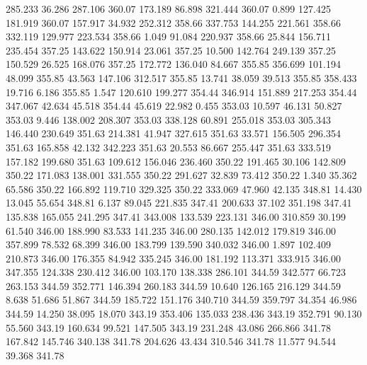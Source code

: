  285.233   36.286  287.106       360.07
 173.189   86.898  321.444       360.07
   0.899  127.425  181.919       360.07
 157.917   34.932  252.312       358.66
 337.753  144.255  221.561       358.66
 332.119  129.977  223.534       358.66
   1.049   91.084  220.937       358.66
  25.844  156.711  235.454       357.25
 143.622  150.914   23.061       357.25
  10.500  142.764  249.139       357.25
 150.529   26.525  168.076       357.25
 172.772  136.040   84.667       355.85
 356.699  101.194   48.099       355.85
  43.563  147.106  312.517       355.85
  13.741   38.059   39.513       355.85
 358.433   19.716    6.186       355.85
   1.547  120.610  199.277       354.44
 346.914  151.889  217.253       354.44
 347.067   42.634   45.518       354.44
  45.619   22.982    0.455       353.03
  10.597   46.131   50.827       353.03
   9.446  138.002  208.307       353.03
 338.128   60.891  255.018       353.03
 305.343  146.440  230.649       351.63
 214.381   41.947  327.615       351.63
  33.571  156.505  296.354       351.63
 165.858   42.132  342.223       351.63
  20.553   86.667  255.447       351.63
 333.519  157.182  199.680       351.63
 109.612  156.046  236.460       350.22
 191.465   30.106  142.809       350.22
 171.083  138.001  331.555       350.22
 291.627   32.839   73.412       350.22
   1.340   35.362   65.586       350.22
 166.892  119.710  329.325       350.22
 333.069   47.960   42.135       348.81
  14.430   13.045   55.654       348.81
   6.137   89.045  221.835       347.41
 200.633   37.102  351.198       347.41
 135.838  165.055  241.295       347.41
 343.008  133.539  223.131       346.00
 310.859   30.199   61.540       346.00
 188.990   83.533  141.235       346.00
 280.135  142.012  179.819       346.00
 357.899   78.532   68.399       346.00
 183.799  139.590  340.032       346.00
   1.897  102.409  210.873       346.00
 176.355   84.942  335.245       346.00
 181.192  113.371  333.915       346.00
 347.355  124.338  230.412       346.00
 103.170  138.338  286.101       344.59
 342.577   66.723  263.153       344.59
 352.771  146.394  260.183       344.59
  10.640  126.165  216.129       344.59
   8.638   51.686   51.867       344.59
 185.722  151.176  340.710       344.59
 359.797   34.354   46.986       344.59
  14.250   38.095   18.070       343.19
 353.406  135.033  238.436       343.19
 352.791   90.130   55.560       343.19
 160.634   99.521  147.505       343.19
 231.248   43.086  266.866       341.78
 167.842  145.746  340.138       341.78
 204.626   43.434  310.546       341.78
  11.577   94.544   39.368       341.78
